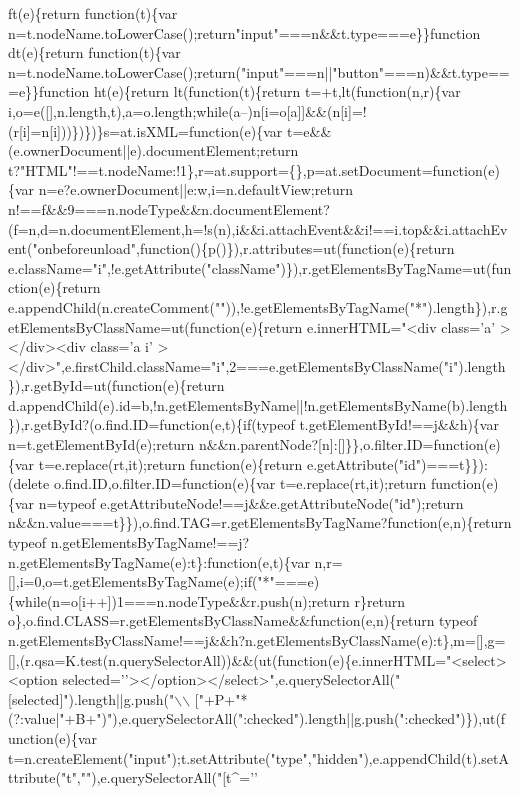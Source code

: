 \begin{DoxyCode}
{       ft(e)\{return function(t)\{var n=t.nodeName.toLowerCase();return"input"===n&&t.type===e\}\}function dt(e)\{return
       function(t)\{var n=t.nodeName.toLowerCase();return("input"===n||"button"===n)&&t.type===e\}\}function
       ht(e)\{return lt(function(t)\{return t=+t,lt(function(n,r)\{var
       i,o=e([],n.length,t),a=o.length;while(a--)n[i=o[a]]&&(n[i]=!(r[i]=n[i]))\})\})\}s=at.isXML=function(e)\{var t=e&&(e.ownerDocument||e).documentElement;return
       t?"HTML"!==t.nodeName:!1\},r=at.support=\{\},p=at.setDocument=function(e)\{var
       n=e?e.ownerDocument||e:w,i=n.defaultView;return
       n!==f&&9===n.nodeType&&n.documentElement?(f=n,d=n.documentElement,h=!s(n),i&&i.attachEvent&&i!==i.top&&i.attachEvent("onbeforeunload",function()\{p()\}),r.attributes=ut(function(e)\{return
       e.className="i",!e.getAttribute("className")\}),r.getElementsByTagName=ut(function(e)\{return
       e.appendChild(n.createComment("")),!e.getElementsByTagName("*").length\}),r.getElementsByClassName=ut(function(e)\{return e.innerHTML="<div class='}a\textcolor{stringliteral}{'
      ></div><div class='}a i\textcolor{stringliteral}{'
      ></div>",e.firstChild.className="i",2===e.getElementsByClassName("i").length\}),r.getById=ut(function(e)\{return
       d.appendChild(e).id=b,!n.getElementsByName||!n.getElementsByName(b).length\}),r.getById?(o.find.ID=function(e,t)\{if(typeof t.getElementById!==j&&h)\{var n=t.getElementById(e);return
       n&&n.parentNode?[n]:[]\}\},o.filter.ID=function(e)\{var t=e.replace(rt,it);return function(e)\{return
       e.getAttribute("id")===t\}\}):(delete o.find.ID,o.filter.ID=function(e)\{var t=e.replace(rt,it);return function(e)\{var n=typeof
       e.getAttributeNode!==j&&e.getAttributeNode("id");return
       n&&n.value===t\}\}),o.find.TAG=r.getElementsByTagName?function(e,n)\{return typeof n.getElementsByTagName!==j?n.getElementsByTagName(e):t\}:function(e,t)\{var
       n,r=[],i=0,o=t.getElementsByTagName(e);if("*"===e)\{while(n=o[i++])1===n.nodeType&&r.push(n);return r\}return
       o\},o.find.CLASS=r.getElementsByClassName&&function(e,n)\{return typeof
       n.getElementsByClassName!==j&&h?n.getElementsByClassName(e):t\},m=[],g=[],(r.qsa=K.test(n.querySelectorAll))&&(ut(function(e)\{e.innerHTML="<select><option
       selected='}\textcolor{stringliteral}{'></option></select>",e.querySelectorAll("[selected]").length||g.push("\(\backslash\)\(\backslash\)
      ["+P+"*(?:value|"+B+")"),e.querySelectorAll(":checked").length||g.push(":checked")\}),ut(function(e)\{var
       t=n.createElement("input");t.setAttribute("type","hidden"),e.appendChild(t).setAttribute("t",""),e.querySelectorAll("[t^='}\textcolor{stringliteral}{'
}
\end{DoxyCode}
